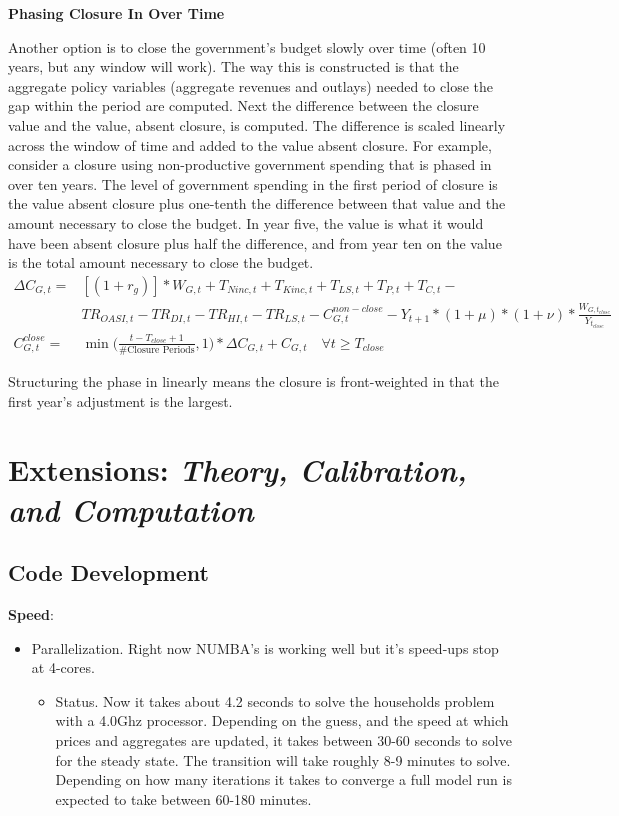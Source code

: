 \documentclass[11pt,leqno,fleqn]{article}
\begin{document}
\begin{flushleft}
	\textbf{Phasing Closure In Over Time} 
\end{flushleft}
Another option is to close the government's budget slowly over time (often 10 years, but any window will work). The way this is constructed is that the aggregate policy variables (aggregate revenues and outlays) needed to close the gap within the period are computed. Next the difference between the closure value and the value, absent closure, is computed. The difference is scaled linearly across the window of time and added to the value absent closure. For example, consider a closure using non-productive government spending that is phased in over ten years. The level of government spending in the first period of closure is the value absent closure plus one-tenth the difference between that value and the amount necessary to close the budget. In year five, the value is what it would have been absent closure plus half the difference, and from year ten on the value is the total amount necessary to close the  budget.
\begin{align*}
\Delta C_{G,t} = &[(1+r_g)]*W_{G,t} + T_{Ninc,t} + T_{Kinc,t} + T_{LS,t} + T_{P,t} + T_{C,t} - \\
&TR_{OASI,t} - TR_{DI,t} - TR_{HI,t} - TR_{LS,t}  - C_{G,t}^{non-close} - Y_{t+1}*(1+\mu)*(1+\nu)*\frac{W_{G,t_{close}}}{Y_{t_{close}}}\\
C_{G,t}^{close} = &\min\Big(\frac{t-T_{close}+1}{\text{\# Closure Periods}},1\Big)*\Delta C_{G,t} + C_{G,t} \quad \forall t\ge T_{close}
\end{align*}

Structuring the phase in linearly means the closure is front-weighted in that the first year's adjustment is the largest.

\section{Extensions: \textit{Theory, Calibration, and Computation}}

\subsection{Code Development}

\textbf{Speed}:
\begin{itemize}
	\item Parallelization. Right now NUMBA's is working well but it's speed-ups stop at 4-cores. 
	\begin{itemize}
		\item Status. Now it takes about 4.2 seconds to solve the households problem with a 4.0Ghz processor. Depending on the guess, and the speed at which prices and aggregates are updated, it takes between 30-60 seconds to solve for the steady state. The transition will take roughly 8-9 minutes to solve. Depending on how many iterations it takes to converge a full model run is expected to take between 60-180 minutes.
	\end{itemize}
\end{itemize}
\end{document}
